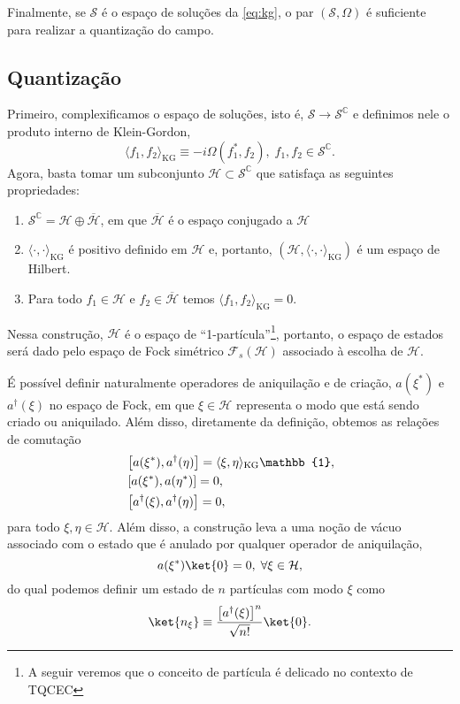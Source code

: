 \documentclass[12pt]{article}
\newcommand{\s}{\mathcal{S}}
\newcommand{\innerkg}[2]{\langle#1,#2\rangle_{\text{KG}}}
\newcommand{\h}{\mathcal{H}}
\begin{document}
Finalmente, se \(\s\) é o espaço de soluções da \cref{eq:kg}, o par \((\s,\Omega)\) é suficiente para realizar a quantização do campo.

\subsection*{Quantização}
Primeiro, complexificamos o espaço de soluções, isto é, \(\s\to\s^{\mathbb{C}}\) e definimos nele o produto interno de Klein-Gordon,
\begin{equation}
    \innerkg{f_1}{f_2}\equiv-i\Omega(f_1^*,f_2),\; f_1,f_2\in\s^{\mathbb{C}}.
\end{equation}
Agora, basta tomar um subconjunto \(\h\subset\s^{\mathbb{C}}\) que satisfaça as seguintes propriedades:
\begin{enumerate}
    \item \(\s^{\mathbb{C}}=\h\oplus\overline{\h}\), em que \(\overline{\h}\) é o espaço conjugado a \(\h\)
    \item \(\innerkg{\cdot}{\cdot}\) é positivo definido em \(\h\) e, portanto, \(\left(\h,\innerkg{\cdot}{\cdot}\right)\) é um espaço de Hilbert.
    \item Para todo \(f_1\in\h\) e \(f_2\in\overline{\h}\) temos \(\innerkg{f_1}{f_2}=0\).
\end{enumerate}

Nessa construção, \(\h\) é o espaço de \enquote{1-partícula}\footnote{A seguir veremos que o conceito de partícula é delicado no contexto de TQCEC}, portanto, o espaço de estados será dado pelo espaço de Fock simétrico \(\mathcal{F}_s(\h)\) associado à escolha de \(\h\).

É possível definir naturalmente operadores de aniquilação e de criação, \(a(\xi^*)\) e \(a^\dagger(\xi)\) no espaço de Fock, em que \(\xi\in\h\) representa o modo que está sendo criado ou aniquilado. Além disso, diretamente da definição, obtemos as relações de comutação
\begin{subequations}
    \begin{align}
        &\relax\left[a(\xi^*),a^{\dagger}(\eta)\right]=\innerkg{\xi}{\eta}\mathbb{1},\\
        &\relax\left[a(\xi^*),a(\eta^*)\right]=0,\\
        &\relax\left[a^{\dagger}(\xi),a^{\dagger}(\eta)\right]=0,
    \end{align}
\end{subequations}
para todo \(\xi,\eta\in\h\). Além disso, a construção leva a uma noção de vácuo associado com o estado que é anulado por qualquer operador de aniquilação,
\begin{equation}
    a(\xi^*)\ket{0}=0,\;\forall\xi\in\h,
\end{equation}
do qual podemos definir um estado de \(n\) partículas com modo \(\xi\) como
\begin{equation}
    \ket{n_\xi}\equiv\frac{\left[a^{\dagger}(\xi)\right]^n}{\sqrt{n!}}\ket{0}.
\end{equation}
\end{document}
